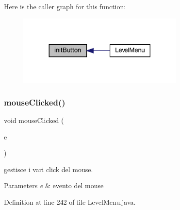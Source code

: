 Here is the caller graph for this function\+:\nopagebreak
\begin{figure}[H]
\begin{center}
\leavevmode
\includegraphics[width=236pt]{classui_1_1_level_menu_aed9fe7e919d4355a7ad86701d44e1fea_icgraph}
\end{center}
\end{figure}
\mbox{\label{classui_1_1_level_menu_a45d56bd84238e8b56589dfc732e2b2cf}} 
\subsubsection{\texorpdfstring{mouse\+Clicked()}{mouseClicked()}}
{\footnotesize\ttfamily void mouse\+Clicked (\begin{DoxyParamCaption}\item[{Mouse\+Event}]{e }\end{DoxyParamCaption})}



gestisce i vari click del mouse. 


\begin{DoxyParams}{Parameters}
{\em e} & evento del mouse \\
\hline
\end{DoxyParams}


Definition at line 242 of file Level\+Menu.\+java.

